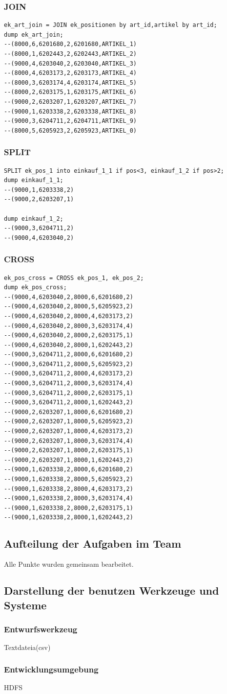 \begin{itemize}
\subsubsection*{JOIN}
\begin{lstlisting}
ek_art_join = JOIN ek_positionen by art_id,artikel by art_id;
dump ek_art_join;
--(8000,6,6201680,2,6201680,ARTIKEL_1)
--(8000,1,6202443,2,6202443,ARTIKEL_2)
--(9000,4,6203040,2,6203040,ARTIKEL_3)
--(8000,4,6203173,2,6203173,ARTIKEL_4)
--(8000,3,6203174,4,6203174,ARTIKEL_5)
--(8000,2,6203175,1,6203175,ARTIKEL_6)
--(9000,2,6203207,1,6203207,ARTIKEL_7)
--(9000,1,6203338,2,6203338,ARTIKEL_8)
--(9000,3,6204711,2,6204711,ARTIKEL_9)
--(8000,5,6205923,2,6205923,ARTIKEL_0)
\end{lstlisting}

\subsubsection*{SPLIT}
\begin{lstlisting}
SPLIT ek_pos_1 into einkauf_1_1 if pos<3, einkauf_1_2 if pos>2;
dump einkauf_1_1;
--(9000,1,6203338,2)
--(9000,2,6203207,1)

dump einkauf_1_2; 
--(9000,3,6204711,2)
--(9000,4,6203040,2)
\end{lstlisting}

\subsubsection*{CROSS}
\begin{lstlisting}
ek_pos_cross = CROSS ek_pos_1, ek_pos_2;
dump ek_pos_cross;
--(9000,4,6203040,2,8000,6,6201680,2)
--(9000,4,6203040,2,8000,5,6205923,2)
--(9000,4,6203040,2,8000,4,6203173,2)
--(9000,4,6203040,2,8000,3,6203174,4)
--(9000,4,6203040,2,8000,2,6203175,1)
--(9000,4,6203040,2,8000,1,6202443,2)
--(9000,3,6204711,2,8000,6,6201680,2)
--(9000,3,6204711,2,8000,5,6205923,2)
--(9000,3,6204711,2,8000,4,6203173,2)
--(9000,3,6204711,2,8000,3,6203174,4)
--(9000,3,6204711,2,8000,2,6203175,1)
--(9000,3,6204711,2,8000,1,6202443,2)
--(9000,2,6203207,1,8000,6,6201680,2)
--(9000,2,6203207,1,8000,5,6205923,2)
--(9000,2,6203207,1,8000,4,6203173,2)
--(9000,2,6203207,1,8000,3,6203174,4)
--(9000,2,6203207,1,8000,2,6203175,1)
--(9000,2,6203207,1,8000,1,6202443,2)
--(9000,1,6203338,2,8000,6,6201680,2)
--(9000,1,6203338,2,8000,5,6205923,2)
--(9000,1,6203338,2,8000,4,6203173,2)
--(9000,1,6203338,2,8000,3,6203174,4)
--(9000,1,6203338,2,8000,2,6203175,1)
--(9000,1,6203338,2,8000,1,6202443,2)
\end{lstlisting}
\end{itemize}
\subsection*{Aufteilung der Aufgaben im Team}
Alle Punkte wurden gemeinsam bearbeitet.
\subsection*{Darstellung der benutzen Werkzeuge und Systeme}
\subsubsection*{Entwurfswerkzeug}
Textdateia(csv)
\subsubsection*{Entwicklungsumgebung}
HDFS
